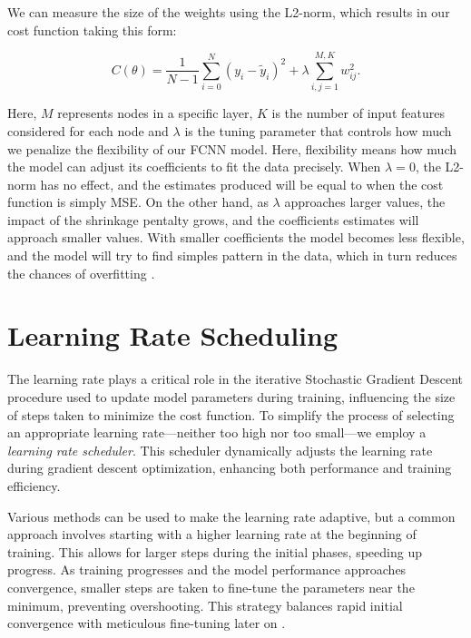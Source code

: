\documentclass[a4paper, UKenglish, 11pt]{uiomaster}
\begin{document}
We can measure the size of the weights using the L2-norm, which results in our cost function taking this form:

\begin{equation}
C(\theta) = \frac{1}{N-1}
\sum_{i=0}^{N}(y_i-\tilde{y}_i)^2 + \lambda\sum_{i,j = 1}^{M, K}w^2_{ij}.
\label{eq:L2}
\end{equation}

Here, $M$ represents nodes in a specific layer, $K$ is the number of input features considered for each node and $\lambda$ is the tuning parameter that controls how much we penalize the flexibility of our FCNN model. Here, flexibility means how much the model can adjust its coefficients to fit the data precisely. When $\lambda = 0$, the L2-norm has no effect, and the estimates produced will be equal to when the cost function is simply MSE. On the other hand, as $\lambda$ approaches larger values, the impact of the shrinkage pentalty grows, and the coefficients estimates will approach smaller values. With smaller coefficients the model becomes less flexible, and the model will try to find simples pattern in the data, which in turn reduces the chances of overfitting \cite{gupta2017regularization}.


\section{Learning Rate Scheduling}
The learning rate plays a critical role in the iterative Stochastic Gradient Descent procedure used to update model parameters during training, influencing the size of steps taken to minimize the cost function. To simplify the process of selecting an appropriate learning rate—neither too high nor too small—we employ a \emph{learning rate scheduler}. This scheduler dynamically adjusts the learning rate during gradient descent optimization, enhancing both performance and training efficiency.

Various methods can be used to make the learning rate adaptive, but a common approach involves starting with a higher learning rate at the beginning of training. This allows for larger steps during the initial phases, speeding up progress. As training progresses and the model performance approaches convergence, smaller steps are taken to fine-tune the parameters near the minimum, preventing overshooting. This strategy balances rapid initial convergence with meticulous fine-tuning later on \cite{pytorch_learning_rate_schedule}.
\end{document}
